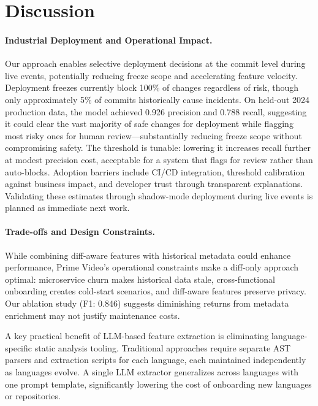 \section{Discussion}

\paragraph{Industrial Deployment and Operational Impact.}
Our approach enables selective deployment decisions at the commit level during live events, potentially reducing freeze scope and accelerating feature velocity. Deployment freezes currently block 100\% of changes regardless of risk, though only approximately 5\% of commits historically cause incidents. On held-out 2024 production data, the model achieved 0.926 precision and 0.788 recall, suggesting it could clear the vast majority of safe changes for deployment while flagging most risky ones for human review---substantially reducing freeze scope without compromising safety. The threshold is tunable: lowering it increases recall further at modest precision cost, acceptable for a system that flags for review rather than auto-blocks. Adoption barriers include CI/CD integration, threshold calibration against business impact, and developer trust through transparent explanations. Validating these estimates through shadow-mode deployment during live events is planned as immediate next work.

\paragraph{Trade-offs and Design Constraints.}
While combining diff-aware features with historical metadata could enhance performance, Prime Video's operational constraints make a diff-only approach optimal: microservice churn makes historical data stale, cross-functional onboarding creates cold-start scenarios, and diff-aware features preserve privacy. Our ablation study (F1: 0.846) suggests diminishing returns from metadata enrichment may not justify maintenance costs.

A key practical benefit of LLM-based feature extraction is eliminating language-specific static analysis tooling. Traditional approaches require separate AST parsers and extraction scripts for each language, each maintained independently as languages evolve. A single LLM extractor generalizes across languages with one prompt template, significantly lowering the cost of onboarding new languages or repositories.

